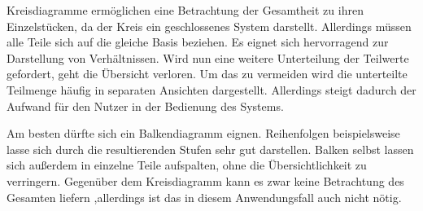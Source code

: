 Kreisdiagramme ermöglichen eine Betrachtung der Gesamtheit zu ihren Einzelstücken, da der Kreis ein geschlossenes System darstellt. Allerdings müssen alle Teile sich auf die gleiche Basis beziehen. Es eignet sich hervorragend zur Darstellung von Verhältnissen. Wird nun eine weitere Unterteilung der Teilwerte gefordert, geht die Übersicht verloren. Um das zu vermeiden wird die unterteilte Teilmenge häufig in separaten Ansichten dargestellt. Allerdings steigt dadurch der Aufwand für den Nutzer in der Bedienung des Systems. 

Am besten dürfte sich ein Balkendiagramm eignen. Reihenfolgen beispielsweise lasse sich durch die resultierenden Stufen sehr gut darstellen. Balken selbst lassen sich außerdem in einzelne Teile aufspalten, ohne die Übersichtlichkeit zu verringern. Gegenüber dem Kreisdiagramm kann es zwar keine Betrachtung des Gesamten liefern ,allerdings ist das in diesem Anwendungsfall auch nicht nötig. 